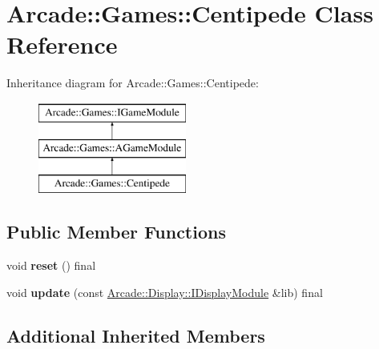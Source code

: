 \hypertarget{classArcade_1_1Games_1_1Centipede}{}\section{Arcade\+::Games\+::Centipede Class Reference}
\label{classArcade_1_1Games_1_1Centipede}
Inheritance diagram for Arcade\+::Games\+::Centipede\+:\begin{figure}[H]
\begin{center}
\leavevmode
\includegraphics[height=3.000000cm]{classArcade_1_1Games_1_1Centipede}
\end{center}
\end{figure}
\subsection*{Public Member Functions}
\begin{DoxyCompactItemize}
\item 
\mbox{\label{classArcade_1_1Games_1_1Centipede_af32b470589322a425db91cf61d5d5c18}} 
void {\bfseries reset} () final
\item 
\mbox{\label{classArcade_1_1Games_1_1Centipede_a11a932a0abda301ae6037c6b97532e79}} 
void {\bfseries update} (const \mbox{\hyperlink{classArcade_1_1Display_1_1IDisplayModule}{Arcade\+::\+Display\+::\+I\+Display\+Module}} \&lib) final
\end{DoxyCompactItemize}
\subsection*{Additional Inherited Members}
